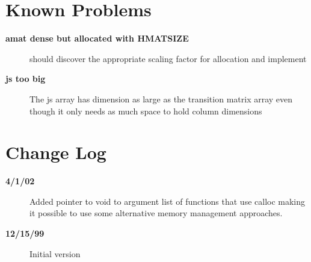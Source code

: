 \documentclass{article}
\begin{document}
\section{Known Problems}
\begin{description}
\item[{\bf amat dense but allocated with HMATSIZE}] should discover the
appropriate scaling factor for allocation and implement
\item[{\bf js too big}] The js array has dimension as large as the transition
matrix array even though it only needs as much space to hold column dimensions
\end{description}
\section{Change Log}
\begin{description}
\item[{\bf 4/1/02}] Added pointer to void to argument list of functions that use
calloc making it possible to use some alternative memory management approaches.
\item[{\bf 12/15/99}] Initial version
\end{description}

\end{document}
